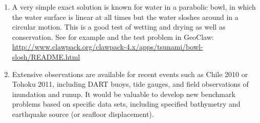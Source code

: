 \begin{enumerate}
\item A very simple exact solution is known for water in a parabolic bowl,
in which the water surface is linear at all times but the water sloshes
around in a circular motion. This is a good test of wetting and drying
as well as conservation. See for example
\cite{ga-pa-ca:wb07,Thacker:1981} and the test problem in GeoClaw:\\
\url{http://www.clawpack.org/clawpack-4.x/apps/tsunami/bowl-slosh/README.html}


\item Extensive observations are available for recent events such as Chile
2010 or Tohoku 2011, including DART buoys, tide gauges, and field
observations of inundation and runup.  It would be valuable to develop new
benchmark problems based on specific data sets, including specified
bathymetry and earthquake source (or seafloor displacement). 

\end{enumerate} 

